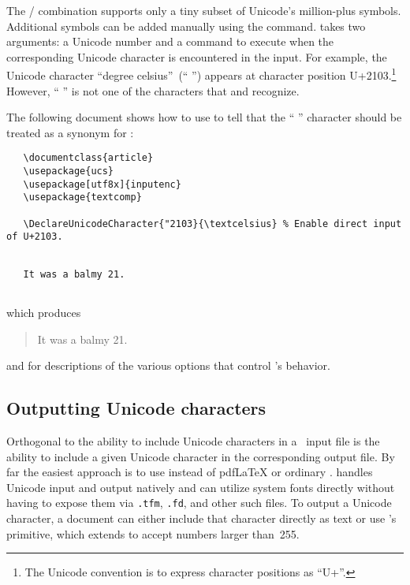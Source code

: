 The \slash{} combination supports only a
tiny subset of Unicode's million-plus symbols.  Additional symbols can
be added manually using the \cmd{\DeclareUnicodeCharacter} command.
\cmd{\DeclareUnicodeCharacter} takes two arguments: a Unicode number
and a \latex{} command to execute when the corresponding Unicode
character is encountered in the input.  For example, the Unicode
character ``degree celsius''~(``\,\textcelsius\,'') appears at
character position U+2103.\footnote{The Unicode convention is to
  express character positions as ``U+''.}
However, ``\,\texttt{\textcelsius}\,'' is not one of the characters
that  and  recognize.  

The following
document shows how to use \cmd{\DeclareUnicodeCharacter} to tell
\latex{} that the ``\,\texttt{\textcelsius}\,'' character should be
treated as a synonym for :

\begin{verbatim}
   \documentclass{article}
   \usepackage{ucs}
   \usepackage[utf8x]{inputenc}
   \usepackage{textcomp}

   \DeclareUnicodeCharacter{"2103}{\textcelsius} % Enable direct input of U+2103.
\end{verbatim}
\noindent
\verb|   | \\
\verb|   |\texttt{It was a balmy 21\textcelsius.} \\
\verb|   |

\medskip

\noindent
which produces

\begin{quotation}
  It was a balmy 21\textcelsius.
\end{quotation}

 and for descriptions of the various options that control 's behavior.


\subsection{Outputting Unicode characters}

Orthogonal to the ability to include Unicode characters in a
\latex\ input file is the ability to include a given Unicode character
in the corresponding output file.  By far the easiest approach is to
use \xelatex instead of pdf\LaTeX{} or
ordinary \latex.  \xelatex handles Unicode input and output natively
and can utilize system fonts directly without having to expose them
via \texttt{.tfm}, \texttt{.fd}, and other such files.  To output a
Unicode character, a \xelatex document can either include that
character directly as \utfviii text or use \tex's \cmd{\char}
primitive, which \xelatex extends to accept numbers larger than~255.

